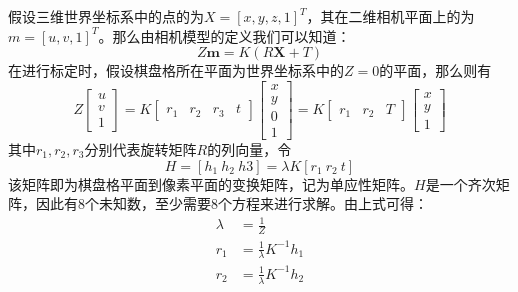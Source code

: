 假设三维世界坐标系中的点的\qczb 为\(X = [x,y,z,1]^T\)，其在二维相机平面上的\qczb 为\(m = [u,v,1]^T\)。那么由相机模型的定义我们可以知道：
\begin{equation}
    Z \bm{m} = K(R\bm{X} + T)
\end{equation}
在进行标定时，假设棋盘格所在平面为世界坐标系中的\(Z=0\)的平面，那么则有
\begin{equation}
    Z\left[ \begin{array}{c} u \\ v \\ 1 \end{array} \right] = K\left[
        \begin{array}{cccc} r_1 & r_2 & r_3 & t\end{array}
        \right]
    \left[
        \begin{array}{c}x \\y \\0 \\1\end{array}
        \right]=K
    \left[
        \begin{array}{cccc} r_1 & r_2 & T\end{array}
        \right]
    \left[
        \begin{array}{c}x \\y \\1\end{array}
        \right]
\end{equation}
其中\(r_1,r_2,r_3\)分别代表旋转矩阵\(R\)的列向量，令
\begin{equation}
    H=[h_1\ h_2\ h3] = \lambda K[r_1\ r_2\ t]
\end{equation}
该矩阵即为棋盘格平面到像素平面的变换矩阵，记为单应性矩阵。\(H\)是一个齐次矩阵，因此有8个未知数，至少需要8个方程来进行求解。由上式可得：
\begin{align}
    \lambda & = \frac{1}{Z}                 \\
    r_1     & = \frac{1}{\lambda} K^{-1}h_1 \\
    r_2     & = \frac{1}{\lambda} K^{-1}h_2
\end{align}

